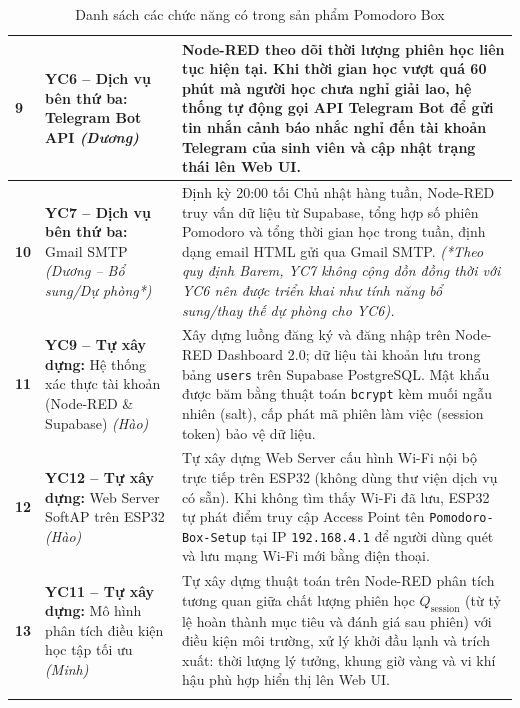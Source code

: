 \begin{longtable}{|>{\centering\arraybackslash}p{0.8cm}|>{\raggedright\arraybackslash}p{4.5cm}|>{\raggedright\arraybackslash}p{11.3cm}|}
\textbf{9} & \textbf{YC6 -- Dịch vụ bên thứ ba:} \newline Telegram Bot API \newline \textit{(Dương)} & Node-RED theo dõi thời lượng phiên học liên tục hiện tại. Khi thời gian học vượt quá 60 phút mà người học chưa nghỉ giải lao, hệ thống tự động gọi API Telegram Bot để gửi tin nhắn cảnh báo nhắc nghỉ đến tài khoản Telegram của sinh viên và cập nhật trạng thái lên Web UI. \\ \hline

\textbf{10} & \textbf{YC7 -- Dịch vụ bên thứ ba:} \newline Gmail SMTP \newline \textit{(Dương -- Bổ sung/Dự phòng*)} & Định kỳ 20:00 tối Chủ nhật hàng tuần, Node-RED truy vấn dữ liệu từ Supabase, tổng hợp số phiên Pomodoro và tổng thời gian học trong tuần, định dạng email HTML gửi qua Gmail SMTP. \textit{(*Theo quy định Barem, YC7 không cộng dồn đồng thời với YC6 nên được triển khai như tính năng bổ sung/thay thế dự phòng cho YC6).} \\ \hline

\textbf{11} & \textbf{YC9 -- Tự xây dựng:} \newline Hệ thống xác thực tài khoản (Node-RED \& Supabase) \newline \textit{(Hào)} & Xây dựng luồng đăng ký và đăng nhập trên Node-RED Dashboard 2.0; dữ liệu tài khoản lưu trong bảng \texttt{users} trên Supabase PostgreSQL. Mật khẩu được băm bằng thuật toán \texttt{bcrypt} kèm muối ngẫu nhiên (salt), cấp phát mã phiên làm việc (session token) bảo vệ dữ liệu. \\ \hline

\textbf{12} & \textbf{YC12 -- Tự xây dựng:} \newline Web Server SoftAP trên ESP32 \newline \textit{(Hào)} & Tự xây dựng Web Server cấu hình Wi-Fi nội bộ trực tiếp trên ESP32 (không dùng thư viện dịch vụ có sẵn). Khi không tìm thấy Wi-Fi đã lưu, ESP32 tự phát điểm truy cập Access Point tên \texttt{Pomodoro-Box-Setup} tại IP \texttt{192.168.4.1} để người dùng quét và lưu mạng Wi-Fi mới bằng điện thoại. \\ \hline

\textbf{13} & \textbf{YC11 -- Tự xây dựng:} \newline Mô hình phân tích điều kiện học tập tối ưu \newline \textit{(Minh)} & Tự xây dựng thuật toán trên Node-RED phân tích tương quan giữa chất lượng phiên học $Q_{\text{session}}$ (từ tỷ lệ hoàn thành mục tiêu và đánh giá sau phiên) với điều kiện môi trường, xử lý khởi đầu lạnh và trích xuất: thời lượng lý tưởng, khung giờ vàng và vi khí hậu phù hợp hiển thị lên Web UI. \\ \hline

\caption{Danh sách các chức năng có trong sản phẩm Pomodoro Box}
\label{tab:danh_sach_chuc_nang}
\end{longtable}
\endgroup
